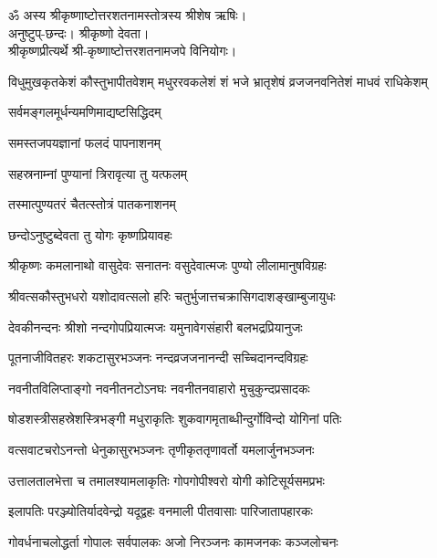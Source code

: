 ॐ अस्य श्रीकृष्णाष्टोत्तरशतनामस्तोत्रस्य श्रीशेष ऋषिः।\\
अनुष्टुप्-छन्दः। श्रीकृष्णो देवता।\\
 श्रीकृष्णप्रीत्यर्थे श्री-कृष्णाष्टोत्तरशतनामजपे विनियोगः।

{विधुमुखकृतकेशं कौस्तुभापीतवेशम्}
{मधुररवकलेशं शं भजे भ्रातृशेषं}
{व्रजजनवनितेशं माधवं राधिकेशम्}


{सर्वमङ्गलमूर्धन्यमणिमाद्यष्टसिद्धिदम्}

{समस्तजपयज्ञानां फलदं पापनाशनम्}

{सहस्रनाम्नां पुण्यानां त्रिरावृत्या तु यत्फलम्}

{तस्मात्पुण्यतरं चैतत्स्तोत्रं पातकनाशनम्}

{छन्दोऽनुष्टुब्देवता तु योगः कृष्णप्रियावहः}

\twolineshloka
{श्रीकृष्णः कमलानाथो वासुदेवः सनातनः}
{वसुदेवात्मजः पुण्यो लीलामानुषविग्रहः}

\twolineshloka
{श्रीवत्सकौस्तुभधरो यशोदावत्सलो हरिः}
{चतुर्भुजात्तचक्रासिगदाशङ्खाम्बुजायुधः}

\twolineshloka
{देवकीनन्दनः श्रीशो नन्दगोपप्रियात्मजः}
{यमुनावेगसंहारी बलभद्रप्रियानुजः}

\twolineshloka
{पूतनाजीवितहरः शकटासुरभञ्जनः}
{नन्दव्रजजनानन्दी सच्चिदानन्दविग्रहः}

\twolineshloka
{नवनीतविलिप्ताङ्गो नवनीतनटोऽनघः}
{नवनीतनवाहारो मुचुकुन्दप्रसादकः}

\twolineshloka
{षोडशस्त्रीसहस्रेशस्त्रिभङ्गी मधुराकृतिः}
{शुकवागमृताब्धीन्दुर्गोविन्दो योगिनां पतिः}

\twolineshloka
{वत्सवाटचरोऽनन्तो धेनुकासुरभञ्जनः}
{तृणीकृततृणावर्तो यमलार्जुनभञ्जनः}

\twolineshloka
{उत्तालतालभेत्ता च तमालश्यामलाकृतिः}
{गोपगोपीश्वरो योगी कोटिसूर्यसमप्रभः}

\twolineshloka
{इलापतिः परञ्ज्योतिर्यादवेन्द्रो यदूद्वहः}
{वनमाली पीतवासाः पारिजातापहारकः}

\twolineshloka
{गोवर्धनाचलोद्धर्ता गोपालः सर्वपालकः}
{अजो निरञ्जनः कामजनकः कञ्जलोचनः}

